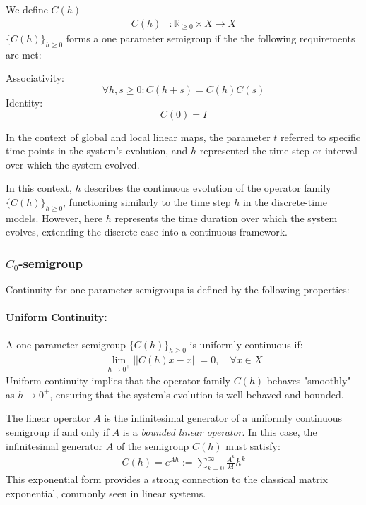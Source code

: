 \documentclass{article}
\newcommand{\R}{\mathbb{R}}
\begin{document}
We define $C(h)$
\begin{align*}
    C(h)&: \R_{\geq0} \times X \rightarrow X \nonumber
\end{align*}
$\{C(h)\}_{h\geq 0}$ forms a one parameter semigroup if the the following requirements are met:

\qquad Associativity:
\begin{equation}
    \forall h,s\geq0: C(h+s) = C(h)C(s) \label{eq:associativity}
\end{equation}
\qquad Identity: 
\begin{equation}
    C(0) = I \label{eq:identity}
\end{equation}

In the context of global and local linear maps, the parameter \( t \) referred to specific time points in the system’s evolution, and \( h \) represented the time step or interval over which the system evolved. 

In this context, $h$ describes the continuous evolution of the operator family $\{C(h)\}_{h\geq 0}$, functioning similarly to the time step 
$h$ in the discrete-time models. However, here 
$h$ represents the time duration over which the system evolves, extending the discrete case into a continuous framework.

\subsubsection{$C_0$-semigroup}

Continuity for one-parameter semigroups is defined by the following properties:

\paragraph{Uniform Continuity:}
A one-parameter semigroup \( \{C(h)\}_{h \geq 0} \) is uniformly continuous if:
\begin{align}
    \lim_{h \to 0^+} || C(h) x - x || = 0, \quad \forall x \in X \label{eq:uniformity}
\end{align}
Uniform continuity implies that the operator family \( C(h) \) behaves "smoothly" as \( h \to 0^+ \), ensuring that the system’s evolution is well-behaved and bounded. 

The linear operator \( A \) is the infinitesimal generator of a uniformly continuous semigroup if and only if \( A \) is a \textit{bounded linear operator}. In this case, the infinitesimal generator \( A \) of the semigroup \( C(h) \) must satisfy:
\begin{align}
    C(h) = e^{Ah} := \sum_{k=0}^{\infty} \frac{A^k}{k!} h^k \label{eq:generator}
\end{align}
This exponential form provides a strong connection to the classical matrix exponential, commonly seen in linear systems.
\end{document}
